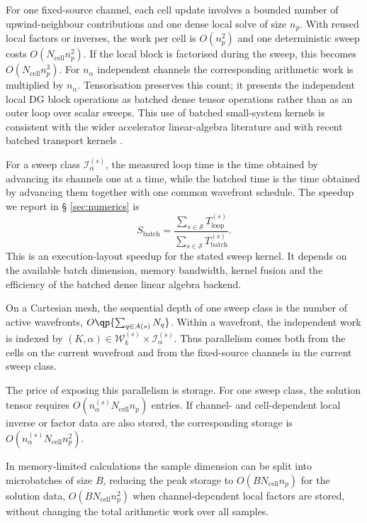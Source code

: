 \documentclass[final]{amsart}
\begin{document}
For one fixed-source channel, each cell update involves a bounded number
of upwind-neighbour contributions and one dense local solve of size
$n_p$.  With reused local factors or inverses, the work per cell is
$O(n_p^2)$ and one deterministic sweep costs
$O(N_{\mathrm{cell}}n_p^2)$. If the local block is factorised during
the sweep, this becomes
$O(N_{\mathrm{cell}}n_p^3)$.  For $n_\alpha$ independent channels the
corresponding arithmetic work is multiplied by $n_\alpha$.
Tensorisation preserves this count; it presents the independent local
DG block operations as batched dense tensor operations rather than as
an outer loop over scalar sweeps. This use of batched small-system
kernels is consistent with the wider accelerator linear-algebra
literature \cite{HaidarEtAl2015BatchedGPU,
  AbdelfattahEtAl2016BatchedGEMM} and with recent batched transport
kernels \cite{SuauEtAl2025Batched}.

For a sweep class $\mathcal{I}_\alpha^{(s)}$, the measured loop time
is the time obtained by advancing its channels one at a time, while
the batched time is the time obtained by advancing them together with
one common wavefront schedule.  The speedup we report in \S
\ref{sec:numerics} is
\begin{equation}
  S_{\mathrm{batch}}
  =
  \frac{
    \sum_{s\in\mathcal{S}} T_{\mathrm{loop}}^{(s)}
  }{
    \sum_{s\in\mathcal{S}} T_{\mathrm{batch}}^{(s)}
  }.
  \label{eq:analysis_batch_speedup}
\end{equation}
This is an execution-layout speedup for the stated sweep kernel.  It
depends on the available batch dimension, memory bandwidth, kernel
fusion and the efficiency of the batched dense linear algebra backend.

On a Cartesian mesh, the sequential depth of one sweep class is the
number of active wavefronts, $O\qp{\sum_{q\in A(s)} N_q}$.
Within a wavefront, the independent work is indexed by
$(K,\alpha)\in\mathcal{W}_k^{(s)}\times\mathcal{I}_\alpha^{(s)}.$ Thus
parallelism comes both from the cells on the current wavefront and
from the fixed-source channels in the current sweep class.

The price of exposing this parallelism is storage.  For one sweep
class, the solution tensor requires
$O(n_\alpha^{(s)}N_{\mathrm{cell}}n_p)$ entries.  If channel- and
cell-dependent local inverse or factor data are also stored, the
corresponding storage is
$O(n_\alpha^{(s)}N_{\mathrm{cell}}n_p^2).$

In memory-limited calculations the sample dimension can be split into
microbatches of size $B$, reducing the peak storage to
$O(BN_{\mathrm{cell}}n_p)$ for the solution data,
$O(BN_{\mathrm{cell}}n_p^2)$ when channel-dependent local factors are
stored, without changing the total arithmetic work over all samples.
\end{document}
